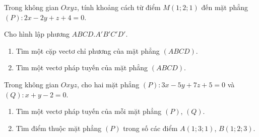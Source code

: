 \begin{ex}%
Trong không gian $Oxyz$, tính khoảng cách từ điểm $M(1; 2; 1)$ đến mặt phẳng $(P)\colon 2x - 2y + z + 4 = 0$.
\end{ex}


\cautl

\begin{ex}%
Cho hình lập phương $ABCD.A'B'C'D'$.
\begin{enumerate}[1.]
\item Tìm một cặp vectơ chỉ phương của mặt phẳng $(ABCD)$.
\item Tìm một vectơ pháp tuyến của mặt phẳng $(ABCD)$.
\end{enumerate}
\end{ex}

\begin{ex}%
Trong không gian $Oxyz$, cho hai mặt phẳng $(P)\colon 3x - 5y + 7z + 5 = 0$ và $(Q)\colon x + y - 2 = 0$.
\begin{enumerate}[1.]
\item Tìm một vectơ pháp tuyến của mỗi mặt phẳng $(P)$, $(Q)$.
\item Tìm điểm thuộc mặt phẳng $(P)$ trong số các điểm $A(1; 3; 1)$, $B(1; 2; 3)$.
\end{enumerate}
\end{ex}
